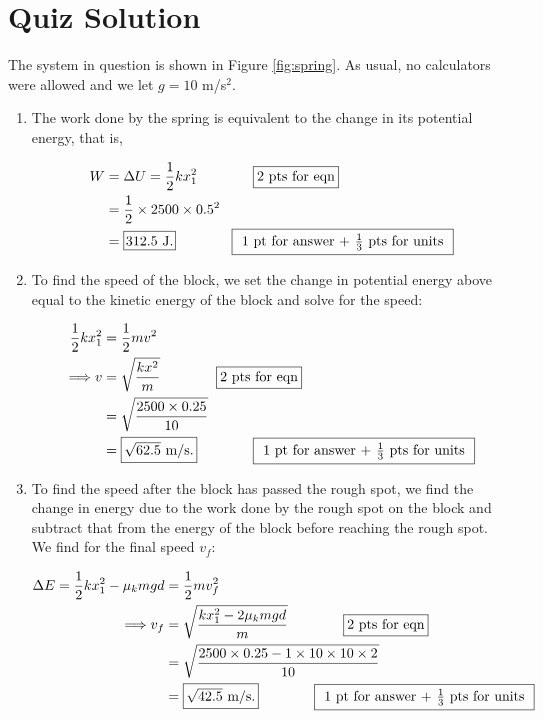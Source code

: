 \documentclass{article}[12pt]
\begin{document}
\section*{Quiz Solution}

\begin{large}
The system in question is shown in Figure \ref{fig:spring}. As usual, no calculators were allowed and we let $g = 10$ m/s$^2$. 

\begin{enumerate}

\item The work done by the spring is equivalent to the change in its potential energy, that is,

\begin{align*} W &= \Delta U = \frac{1}{2} k x_1 ^ 2 \qquad \qquad \framebox[1.1\width]{2 pts for eqn} \\
&= \frac{1}{2} \times 2500 \times 0.5 ^ 2 \\
&= \framebox[1.1\width]{312.5 J.} \qquad \qquad \framebox[1.1\width]{1 pt for answer + $\frac{1}{3}$ pts for units}
\end{align*}

\item To find the speed of the block, we set the change in potential energy above equal to the kinetic energy of the block and solve for 
the speed:

\begin{align*} \frac{1}{2} k x_1 ^ 2  &= \frac{1}{2} m v^2 \\
\Longrightarrow v &= \sqrt{\frac{k x ^ 2}{m}} \qquad \qquad \framebox[1.1\width]{2 pts for eqn} \\
&= \sqrt{\frac{2500 \times 0.25}{10}} \\
&= \framebox[1.1\width]{$\sqrt{62.5}$ m/s.} \qquad \qquad \framebox[1.1\width]{1 pt for answer + $\frac{1}{3}$ pts for units}
\end{align*}

\item To find the speed after the block has passed the rough spot, we find the change in energy due to the work done by the rough spot on the block
and subtract that from the energy of the block before reaching the rough spot. We find for the final speed $v_f$:

\begin{align*} \Delta E = \frac{1}{2} k x_1 ^ 2 - \mu_k m g d &= \frac{1}{2} m v_f ^ 2 \\
\Longrightarrow v_f &= \sqrt{\frac{k x_1 ^ 2 - 2 \mu_k m g d}{m}} \qquad \qquad \framebox[1.1\width]{2 pts for eqn} \\
&= \sqrt{\frac{2500 \times 0.25 - 1 \times 10 \times 10 \times 2}{10}} \\
&= \framebox[1.1\width]{$\sqrt{42.5}$ m/s.} \qquad \qquad \framebox[1.1\width]{1 pt for answer + $\frac{1}{3}$ pts for units}
\end{align*}

\end{enumerate}

\end{large}
\end{document}
